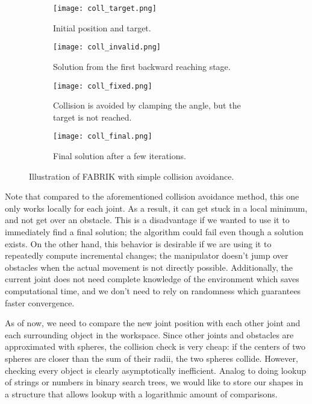 \begin{figure}[h]
    \centering
    \begin{subfigure}{.24\textwidth}
      \texttt{[image: coll\_target.png]}
      \caption{Initial position and target.}
    \end{subfigure}
    \begin{subfigure}{0.24\textwidth}
      \texttt{[image: coll\_invalid.png]}
      \caption{Solution from the first backward reaching stage.}
    \end{subfigure}
    \begin{subfigure}{.24\textwidth}
      \texttt{[image: coll\_fixed.png]}
      \caption{Collision is avoided by clamping the angle, but the target is not reached.}
    \end{subfigure}
    \begin{subfigure}{.24\textwidth}
      \texttt{[image: coll\_final.png]}
      \caption{Final solution after a few iterations.}
    \end{subfigure}
    \caption{Illustration of FABRIK with simple collision avoidance.}\label{fig:coll}
\end{figure}
  
Note that compared to the aforementioned collision avoidance method, this one only works locally for each joint. As a result, it can get stuck in a local minimum, and not get over an obstacle. This is a disadvantage if we wanted to use it to immediately find a final solution; the algorithm could fail even though a solution exists. On the other hand, this behavior is desirable if we are using it to repeatedly compute incremental changes; the manipulator doesn't jump over obstacles when the actual movement is not directly possible. Additionally, the current joint does not need complete knowledge of the environment which saves computational time, and we don't need to rely on randomness which guarantees faster convergence.

As of now, we need to compare the new joint position with each other joint and each surrounding object in the workspace. Since other joints and obstacles are approximated with spheres, the collision check is very cheap: if the centers of two spheres are closer than the sum of their radii, the two spheres collide. However, checking every object is clearly asymptotically inefficient. Analog to doing lookup of strings or numbers in binary search trees, we would like to store our shapes in a structure that allows lookup with a logarithmic amount of comparisons.

